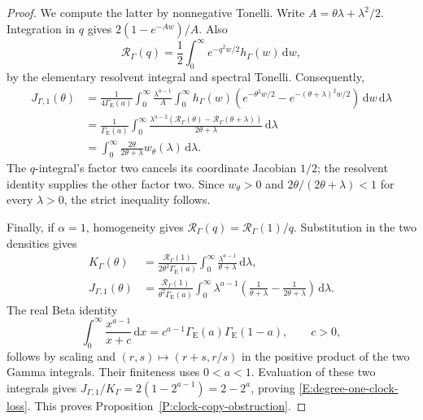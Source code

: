 \documentclass[12pt]{article}
\numberwithin{equation}{section}
\theoremstyle{definition}
\newcommand{\ud}{\,\mathrm{d}}
\begin{document}
\begin{proof}
  We compute the latter by nonnegative Tonelli. Write
  \(A=\theta\lambda+\lambda^2/2\). Integration in \(q\) gives
  \(2(1-e^{-Aw})/A\). Also
  \[
    \mathcal R_\Gamma(q)
    =\frac12\int_0^\infty e^{-q^2w/2}h_\Gamma(w)\ud w,
  \]
  by the elementary resolvent integral and spectral Tonelli.
  Consequently,
  \[
    \begin{split}
      J_{\Gamma,1}(\theta)
      &=\frac1{4\Gamma_{\mathrm E}(a)}
      \int_0^\infty\frac{\lambda^{a-1}}A
      \int_0^\infty h_\Gamma(w)
      \left(e^{-\theta^2w/2}
      -e^{-(\theta+\lambda)^2w/2}\right)\ud w\ud\lambda\\
      &=\frac1{\Gamma_{\mathrm E}(a)}
      \int_0^\infty
      \frac{\lambda^{a-2}
      (\mathcal R_\Gamma(\theta)-\mathcal R_\Gamma(\theta+\lambda))}
      {2\theta+\lambda}\ud\lambda\\
      &=\int_0^\infty
      \frac{2\theta}{2\theta+\lambda}w_\theta(\lambda)\ud\lambda.
    \end{split}
  \]
  The \(q\)-integral's factor two cancels its coordinate Jacobian
  \(1/2\); the resolvent identity supplies the other factor two.
  Since \(w_\theta>0\) and \(2\theta/(2\theta+\lambda)<1\) for
  every \(\lambda>0\), the strict inequality follows.

  Finally, if \(\alpha=1\), homogeneity gives
  \(\mathcal R_\Gamma(q)=\mathcal R_\Gamma(1)/q\).
  Substitution in the two densities gives
  \[
    \begin{split}
      K_\Gamma(\theta)
      &=\frac{\mathcal R_\Gamma(1)}
      {2\theta^2\Gamma_{\mathrm E}(a)}
      \int_0^\infty\frac{\lambda^{a-1}}{\theta+\lambda}\ud\lambda,\\
      J_{\Gamma,1}(\theta)
      &=\frac{\mathcal R_\Gamma(1)}
      {\theta^2\Gamma_{\mathrm E}(a)}
      \int_0^\infty\lambda^{a-1}
      \left(\frac1{\theta+\lambda}
      -\frac1{2\theta+\lambda}\right)\ud\lambda .
    \end{split}
  \]
  The real Beta identity
  \[
    \int_0^\infty\frac{x^{a-1}}{x+c}\ud x
    =c^{a-1}\Gamma_{\mathrm E}(a)\Gamma_{\mathrm E}(1-a),
    \qquad c>0,
  \]
  follows by scaling and
  \((r,s)\mapsto(r+s,r/s)\) in the positive product of the two
  Gamma integrals. Their finiteness uses \(0<a<1\).
  Evaluation of these two integrals gives
  \(J_{\Gamma,1}/K_\Gamma=2(1-2^{a-1})=2-2^a\), proving
  \eqref{E:degree-one-clock-loss}.
  This proves Proposition~\ref{P:clock-copy-obstruction}.
\end{proof}
\end{document}
